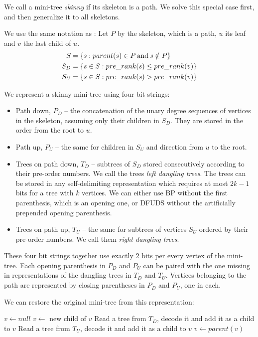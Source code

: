 We call a mini-tree \emph{skinny} if its skeleton is a path.
We solve this special case first, and then generalize it to all skeletons.

We use the same notation as :
Let $P$ by the skeleton, which is a path, $u$ its leaf and $v$ the last child of $u$.
\begin{align*}
	S &= \{ s : parent(s) \in P \mathbin{\textrm{and}} s \notin P \} \\
	S_D &= \{ s \in S : pre\_rank(s) \le pre\_rank(v) \} \\
	S_U &= \{ s \in S : pre\_rank(s) > pre\_rank(v) \}
\end{align*}

We represent a skinny mini-tree using four bit strings:
\begin{itemize}
	\item Path down, $P_D$ -- the concatenation of the unary degree sequences of vertices in the skeleton, assuming only their children in $S_D$.
	They are stored in the order from the root to $u$.
	\item Path up, $P_U$ -- the same for children in $S_U$ and direction from $u$ to the root.
	\item Trees on path down, $T_D$ -- subtrees of $S_D$ stored consecutively according to their pre-order numbers.
	We call the trees \emph{left dangling trees}.
	The trees can be stored in any self-delimiting representation which requires at most $2k - 1$ bits for a tree with $k$ vertices.
	We can either use BP without the first parenthesis, which is an opening one, or DFUDS without the artificially prepended opening parenthesis.
	\item Trees on path up, $T_U$ -- the same for subtrees of vertices $S_U$ ordered by their pre-order numbers.
	We call them \emph{right dangling trees}.
\end{itemize}

These four bit strings together use exactly $2$ bits per every vertex of the mini-tree.
Each opening parenthesis in $P_D$ and $P_U$ can be paired with the one missing in representations of the dangling trees in $T_D$ and $T_U$.
Vertices belonging to the path are represented by closing parentheses in $P_D$ and $P_U$, one in each.

We can restore the original mini-tree from this representation:
\begin{algorithm}
\begin{algorithmic}
	\State $v \gets null$
		\State $v \gets$ new child of $v$
			\State Read a tree from $T_D$, decode it and add it as a child to $v$
		\EndWhile
	\EndWhile
			\State Read a tree from $T_U$, decode it and add it as a child to $v$
		\EndWhile
		\State $v \gets parent(v)$
	\EndWhile
\EndFunction
\end{algorithmic}
\end{algorithm}

